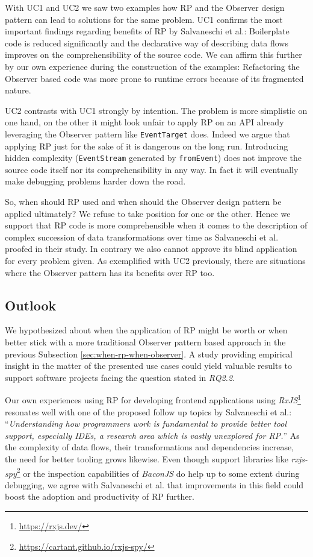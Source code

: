 \documentclass[12pt,a4paper]{article}
\begin{document}
With UC1 and UC2 we saw two examples how RP and the Observer design pattern can lead to solutions for the same problem. UC1 confirms the most important findings regarding benefits of RP by Salvaneschi et al.: Boilerplate code is reduced significantly and the declarative way of describing data flows improves on the comprehensibility of the source code. We can affirm this further by our own experience during the construction of the examples: Refactoring the Observer based code was more prone to runtime errors because of its fragmented nature.

UC2 contrasts with UC1 strongly by intention. The problem is more simplistic on one hand, on the other it might look unfair to apply RP on an API already leveraging the Observer pattern like \texttt{EventTarget} does. Indeed we argue that applying RP just for the sake of it is dangerous on the long run. Introducing hidden complexity (\texttt{EventStream} generated by \texttt{fromEvent}) does not improve the source code itself nor its comprehensibility in any way. In fact it will eventually make debugging problems harder down the road.

So, when should RP used and when should the Observer design pattern be applied ultimately? We refuse to take position for one or the other. Hence we support that RP code is more comprehensible when it comes to the description of complex succession of data transformations over time as Salvaneschi et al. proofed in their study. In contrary we also cannot approve its blind application for every problem given. As exemplified with UC2 previously, there are situations where the Observer pattern has its benefits over RP too.

\subsection{Outlook}

We hypothesized about when the application of RP might be worth or when better stick with a more traditional Observer pattern based approach in the previous Subsection \ref{sec:when-rp-when-observer}. A study providing empirical insight in the matter of the presented use cases could yield valuable results to support software projects facing the question stated in \emph{RQ2.2}.

Our own experiences using RP for developing frontend applications using \emph{RxJS}\footnote{\url{https://rxjs.dev/}} resonates well with one of the proposed follow up topics by Salvaneschi et al.: ``\emph{Understanding how programmers work is fundamental to provide better tool support, especially IDEs, a research area which is vastly unexplored for RP.}''\cite{7827078} As the complexity of data flows, their transformations and dependencies increase, the need for better tooling grows likewise. Even though support libraries like \emph{rxjs-spy}\footnote{\url{https://cartant.github.io/rxjs-spy/}} or the inspection capabilities of \emph{BaconJS} do help up to some extent during debugging, we agree with Salvaneschi et al. that improvements in this field could boost the adoption and productivity of RP further.
\end{document}
